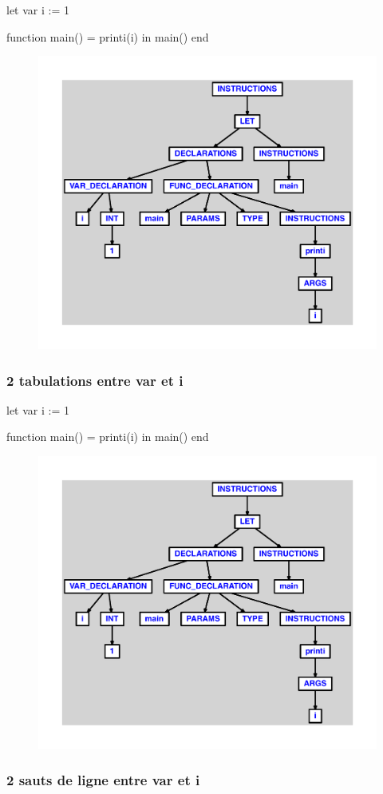 \documentclass{article}
\begin{document}
\begin{verbatimtab}
let
	var  i := 1

	function main() = printi(i)
in main() end
\end{verbatimtab}
\begin{figure}[H]\centering\includegraphics[max width=\textwidth]{ast/ast_335.pdf}\end{figure}\subsubsection{2 tabulations entre var et i}
\begin{verbatimtab}
let
	var		i := 1

	function main() = printi(i)
in main() end
\end{verbatimtab}
\begin{figure}[H]\centering\includegraphics[max width=\textwidth]{ast/ast_336.pdf}\end{figure}\subsubsection{2 sauts de ligne entre var et i}
\end{document}

